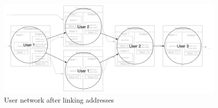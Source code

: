 \begin{figure}[h]
    \centering
    \includegraphics[width=14cm]{figures/usernetwork_related.png}
    \caption{ User network after linking addresses}
    \label{fig:user_graph}
\end{figure}

